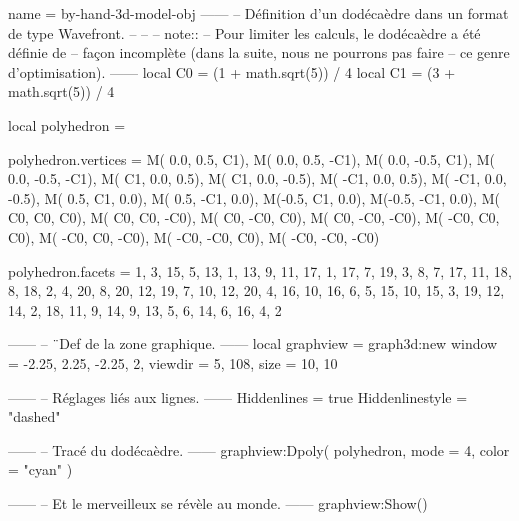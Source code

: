 \documentclass{standalone}
\begin{document}
\begin{luadraw}{name = by-hand-3d-model-obj}
------
-- Définition d'un dodécaèdre dans un format de type Wavefront.
--
--
-- note::
--     Pour limiter les calculs, le dodécaèdre a été définie de
--     façon incomplète (dans la suite, nous ne pourrons pas faire
--     ce genre d'optimisation).
------
local C0 = (1 + math.sqrt(5)) / 4
local C1 = (3 + math.sqrt(5)) / 4

local polyhedron = {}

polyhedron.vertices = {
  M( 0.0,  0.5,   C1),
  M( 0.0,  0.5,  -C1),
  M( 0.0, -0.5,   C1),
  M( 0.0, -0.5,  -C1),
  M(  C1,  0.0,  0.5),
  M(  C1,  0.0, -0.5),
  M( -C1,  0.0,  0.5),
  M( -C1,  0.0, -0.5),
  M( 0.5,   C1,  0.0),
  M( 0.5,  -C1,  0.0),
  M(-0.5,   C1,  0.0),
  M(-0.5,  -C1,  0.0),
  M(  C0,   C0,   C0),
  M(  C0,   C0,  -C0),
  M(  C0,  -C0,   C0),
  M(  C0,  -C0,  -C0),
  M( -C0,   C0,   C0),
  M( -C0,   C0,  -C0),
  M( -C0,  -C0,   C0),
  M( -C0,  -C0,  -C0)
}

polyhedron.facets = {
  {  1,  3, 15,  5, 13},
  {  1, 13,  9, 11, 17},
  {  1, 17,  7, 19,  3},
  {  8,  7, 17, 11, 18},
  {  8, 18,  2,  4, 20},
  {  8, 20, 12, 19,  7},
  { 10, 12, 20,  4, 16},
  { 10, 16,  6,  5, 15},
  { 10, 15,  3, 19, 12},
  { 14,  2, 18, 11,  9},
  { 14,  9, 13,  5,  6},
  { 14,  6, 16,  4,  2}
}

------
-- ¨Def de la zone graphique.
------
local graphview = graph3d:new{
  window  = {-2.25, 2.25, -2.25, 2},
  viewdir = {5, 108},
  size    = {10, 10}
}

------
-- Réglages liés aux lignes.
------
Hiddenlines     = true
Hiddenlinestyle = "dashed"

------
-- Tracé du dodécaèdre.
------
graphview:Dpoly(
  polyhedron,
  {
    mode  = 4,
    color = "cyan"
  })

------
-- Et le merveilleux se révèle au monde.
------
graphview:Show()
\end{luadraw}
\end{document}
